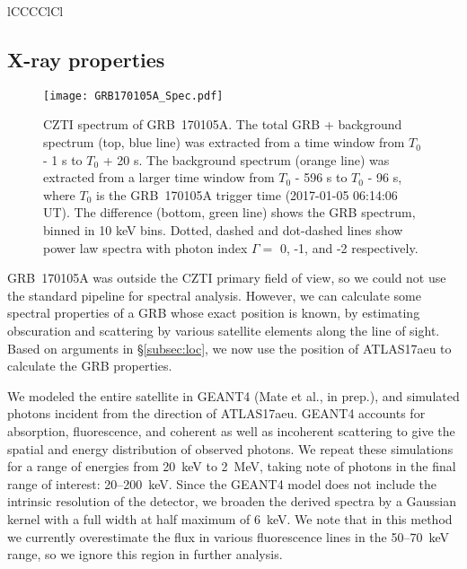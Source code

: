 \documentclass[twocolumn]{aastex6}
\begin{document}
\begin{deluxetable}{lCCCClCl}
\end{deluxetable}


\subsection{X-ray properties}\label{subsec:xrayprop}
\begin{figure}[!tbh]
\texttt{[image: GRB170105A\_Spec.pdf]}
\caption{CZTI spectrum of GRB~170105A. The total GRB + background spectrum (top, blue line) was extracted from a time window from $T_0$ - 1 s to $T_0$ + 20 s. The background spectrum (orange line) was extracted from a larger time window from $T_0$ - 596 s to $T_0$ - 96 s, where $T_0$ is the GRB~170105A trigger time (2017-01-05 06:14:06 UT). The difference (bottom, green line) shows the GRB spectrum, binned in 10 keV bins. Dotted, dashed and dot-dashed lines show power law spectra with photon index $\Gamma = $ 0, -1, and -2 respectively.}
\label{fig:xspec}
\end{figure}

GRB~170105A was outside the CZTI primary field of view, so we could not use the standard pipeline for spectral analysis. However, we can calculate some spectral properties of a GRB whose exact position is known, by estimating obscuration and scattering by various satellite elements along the line of sight. Based on arguments in \S\ref{subsec:loc}, we now use the position of ATLAS17aeu to calculate the GRB properties. 

We modeled the entire satellite in GEANT4 (Mate et al., in prep.), and simulated photons incident from the direction of ATLAS17aeu. GEANT4 accounts for absorption, fluorescence, and coherent as well as incoherent scattering to give the spatial and energy distribution of observed photons. We repeat these simulations for a range of energies from 20~keV to 2~MeV, taking note of photons in the final range of interest: 20--200~keV. Since the GEANT4 model does not include the intrinsic resolution of the detector, we broaden the derived spectra by a Gaussian kernel with a full width at half maximum of 6~keV. We note that in this method we currently overestimate the flux in various fluorescence lines in the 50--70~keV range, so we ignore this region in further analysis.
\end{document}
